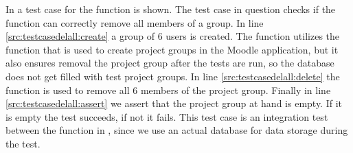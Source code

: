 \begin{comment}

\end{comment}
In  a test case for the function  is shown.
The test case in question checks if the function can correctly remove all members of a group. 
In line \ref{src:testcasedelall:create} a group of $6$ users is created.
The function  utilizes the function that is used to create project groups in the Moodle application, but it also ensures removal the project group after the tests are run, so the database does not get filled with test project groups.
In line \ref{src:testcasedelall:delete} the function  is used to remove all $6$ members of the project group.
Finally in line \ref{src:testcasedelall:assert} we assert that the project group at hand is empty.
If it is empty the test succeeds, if not it fails.
This test case is an integration test between the function  in \admlib{}, since we use an actual database for data storage during the test.


